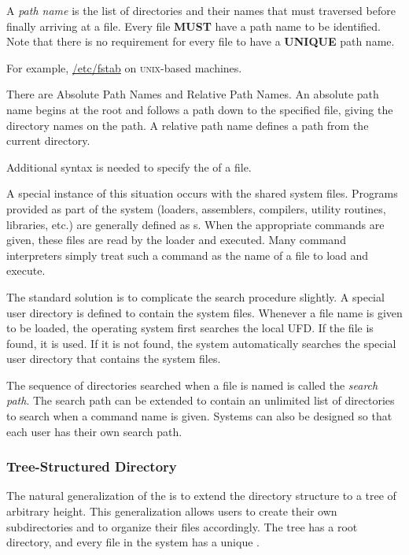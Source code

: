 \begin{definition}\label{def:Path_Name}
  A \emph{path name} is the list of directories and their names that must traversed before finally arriving at a file.
  Every file \textbf{MUST} have a path name to be identified.
  Note that there is no requirement for every file to have a \textbf{UNIQUE} path name.

  For example, \url{/etc/fstab} on \textsc{unix}-based machines.

  There are Absolute Path Names and Relative Path Names.
  An absolute path name begins at the root and follows a path down to the specified file, giving the directory names on the path.
  A relative path name defines a path from the current directory.

  \begin{remark}
    Additional syntax is needed to specify the  of a file.
  \end{remark}
\end{definition}

A special instance of this situation occurs with the shared system files.
Programs provided as part of the system (loaders, assemblers, compilers, utility routines, libraries, etc.) are generally defined as s.
When the appropriate commands are given, these files are read by the loader and executed.
Many command interpreters simply treat such a command as the name of a file to load and execute.

The standard solution is to complicate the search procedure slightly.
A special user directory is defined to contain the system files.
Whenever a file name is given to be loaded, the operating system first searches the local UFD.\@
If the file is found, it is used.
If it is not found, the system automatically searches the special user directory that contains the system files.

\begin{definition}\label{def:Search_Path}
  The sequence of directories searched when a file is named is called the \emph{search path}.
  The search path can be extended to contain an unlimited list of directories to search when a command name is given.
  Systems can also be designed so that each user has their own search path.
\end{definition}

\subsubsection{Tree-Structured Directory}\label{subsubsec:Tree_Structured_Directory}
The natural generalization of the  is to extend the directory structure to a tree of arbitrary height.
This generalization allows users to create their own subdirectories and to organize their files accordingly.
The tree has a root directory, and every file in the system has a unique .

